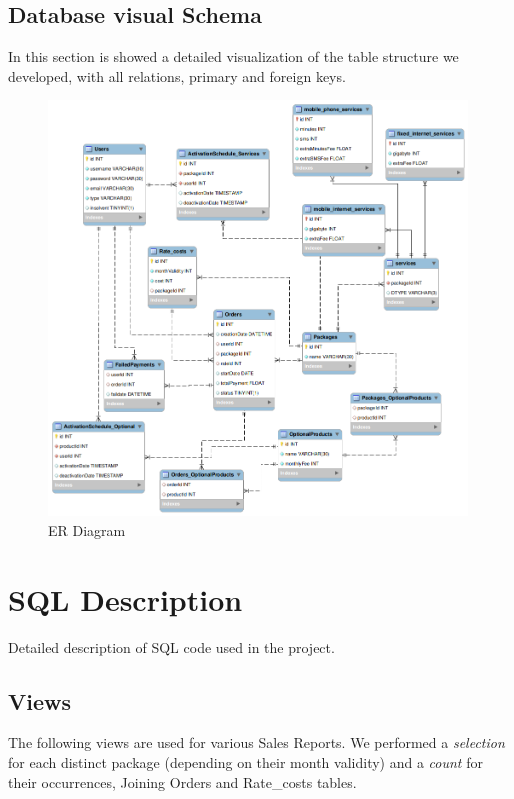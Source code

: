 \documentclass{article}
\begin{document}
\subsection{Database visual Schema}
In this section is showed a detailed visualization of the table structure we developed, with all relations, primary and foreign keys.

\begin{figure}[hbt!]
\centering
\includegraphics[width=0.99\textwidth]{er2.png}
\caption{ER Diagram}
\end{figure}


\newpage
\section{SQL Description}

Detailed description of SQL code used in the project.
\subsection{Views}
\label{views}
The following views are used for various Sales Reports.
We performed a \emph{selection} for each distinct package (depending on their month validity) and a \emph{count} for their occurrences, Joining Orders and Rate_costs tables.
\end{document}
